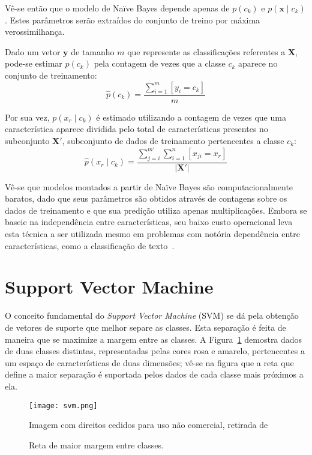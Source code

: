 Vê-se então que o modelo de Naïve Bayes depende apenas de $p(c_k)$ e $p(\mathbf{x} \mid c_k)$.
Estes parâmetros serão extraídos do conjunto de treino por máxima verossimilhança.

Dado um vetor $\mathbf{y}$ de tamanho $m$ que represente as classificações referentes a $\mathbf{X}$, pode-se estimar
$p(c_k)$ pela contagem de vezes que a classe $c_k$ aparece no conjunto de treinamento:
\begin{equation}
    \hat{p}(c_k) = \frac{\sum_{i=1}^m [y_i = c_k]}{m}
\end{equation}

Por sua vez, $p(x_r \mid c_k)$ é estimado utilizando a contagem de vezes que uma característica aparece dividida pelo
total de características presentes no subconjunto $\mathbf{X'}$, subconjunto de dados de treinamento pertencentes a
classe $c_k$:
\begin{equation}
    \hat{p}(x_r \mid c_k) = \frac{\sum_{j=i}^{m'} \sum_{i=1}^n [x_{ji} = x_r]}{|\mathbf{X'}|}
\end{equation}

Vê-se que modelos montados a partir de Naïve Bayes são computacionalmente baratos, dado que seus parâmetros são
obtidos através de contagens sobre os dados de treinamento e que sua predição utiliza apenas multiplicações.
Embora se baseie na independência entre características, seu baixo custo operacional leva esta técnica a ser utilizada
mesmo em problemas com notória dependência entre características, como a classificação de texto~\cite{mccallum98}.

\section{Support Vector Machine}

O conceito fundamental do \textit{Support Vector Machine} (SVM) se dá pela obtenção de vetores de suporte que melhor
separe as classes.
Esta separação é feita de maneira que se maximize a margem entre as classes.
A Figura~\ref{fig:svm} demostra dados de duas classes distintas, representadas pelas cores rosa e amarelo, pertencentes
a um espaço de características de duas dimensões; vê-se na figura que a reta que define a maior separação é suportada
pelos dados de cada classe mais próximos a ela.

\begin{figure}
\begin{center} {
    \begin{center}
    \texttt{[image: svm.png]}
    \caption{Reta de maior margem entre classes.}
    \small Imagem com direitos cedidos para uso não comercial, retirada de~\cite{vanderplas15}
    \label{fig:svm}
    \end{center}
}
\end{center}
\end{figure}

